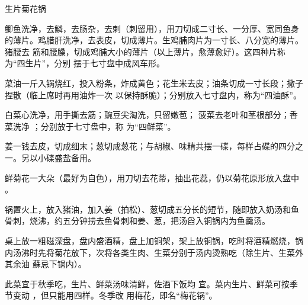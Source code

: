 \begin{recipe}{生片菊花锅}

\ingredients


\preparation

\step 鲫鱼洗净，去鱗，去肠杂，去刺（刺留用），用刀切成二寸长、一分厚、宽同鱼身
的薄片。鸡腊肝洗净，去表皮，切成薄片。生鸡脯肉片为一寸长、八分宽的薄片。猪腰去
筋和腰臊，切成鸡脯大小的薄片（以上薄片，愈薄愈好）。这四种片称为“四生片”，分别
摆于七寸盘中成风车形。

\step 菜油一斤入锅烧红，投入粉条，炸成黄色；花生米去皮；油条切成一寸长段；撒子
捏散（临上席时再用油炸一次 以保持酥脆）；分别放入七寸盘内，称为“四油酥”。

白菜心洗净，用手撕去筋；豌豆尖淘洗，只留嫩苞； 菠菜去老叶和茎根部分；香菜洗净
；分别放于七寸盘中，称 为“四鲜菜”。

\step 姜一钱去皮，切成细末；葱切成葱花；与胡椒、味精共摆一碟，每样占碟的四分之
一。另以小碟盛盐备用。

\step 鲜菊花一大朵（最好为自色），用刀切去花蒂，抽出花蕊，仍以菊花原形放入盘中
。

\step 锅置火上，放入猪油，加入姜（拍松）、葱切成五分长的短节，随即放入奶汤和鱼
骨刺，烧沸，约五分钟捞去鱼骨刺和姜、葱，把汤舀入铜锅内为鱼羹汤。

\step 桌上放一粗磁深盘，盘内盛酒精，盘上加铜架，架上放铜锅，吃时将酒精燃烧，锅
内汤沸时先将菊花放下，次将各类生肉、生菜分别于汤内烫熟吃（除生片、生菜外其余油
蘇忌下锅内）。

\features

此菜宜于秋季吃，生片、鲜菜汤味清鲜，佐酒下饭均 宜。菜内生片、鲜菜可按季节变动
，但只能用四样。冬季改 用梅花，即名“梅花锅”。

\end{recipe}

